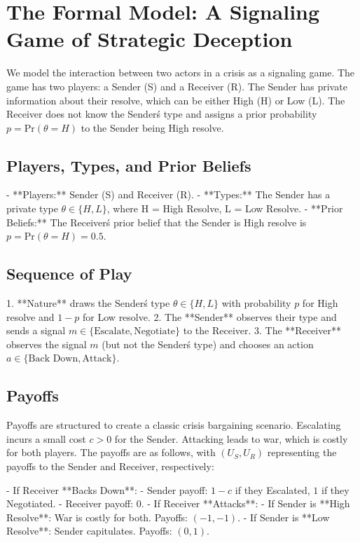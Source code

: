\documentclass[12pt]{article}
\theoremstyle{plain}
\theoremstyle{definition}
\begin{document}
\section{The Formal Model: A Signaling Game of Strategic Deception}

We model the interaction between two actors in a crisis as a signaling game. The game has two players: a Sender (S) and a Receiver (R). The Sender has private information about their resolve, which can be either High (H) or Low (L). The Receiver does not know the Sender\'s type and assigns a prior probability $p = \text{Pr}(\theta = H)$ to the Sender being High resolve.

\subsection{Players, Types, and Prior Beliefs}

- **Players:** Sender (S) and Receiver (R).
- **Types:** The Sender has a private type $\theta \in \{H, L\}$, where H = High Resolve, L = Low Resolve.
- **Prior Beliefs:** The Receiver\'s prior belief that the Sender is High resolve is $p = \text{Pr}(\theta = H) = 0.5$.

\subsection{Sequence of Play}

1.  **Nature** draws the Sender\'s type $\theta \in \{H, L\}$ with probability $p$ for High resolve and $1-p$ for Low resolve.
2.  The **Sender** observes their type and sends a signal $m \in \{\text{Escalate}, \text{Negotiate}\}$ to the Receiver.
3.  The **Receiver** observes the signal $m$ (but not the Sender\'s type) and chooses an action $a \in \{\text{Back Down}, \text{Attack}\}$.

\subsection{Payoffs}

Payoffs are structured to create a classic crisis bargaining scenario. Escalating incurs a small cost $c > 0$ for the Sender. Attacking leads to war, which is costly for both players. The payoffs are as follows, with $(U_S, U_R)$ representing the payoffs to the Sender and Receiver, respectively:

- If Receiver **Backs Down**:
    - Sender payoff: $1 - c$ if they Escalated, $1$ if they Negotiated.
    - Receiver payoff: $0$.
- If Receiver **Attacks**:
    - If Sender is **High Resolve**: War is costly for both. Payoffs: $(-1, -1)$.
    - If Sender is **Low Resolve**: Sender capitulates. Payoffs: $(0, 1)$.
\end{document}
